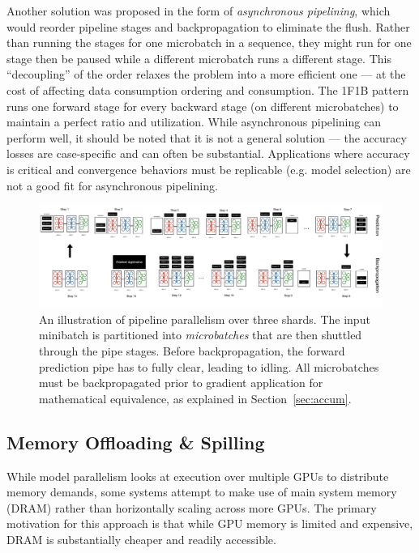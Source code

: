 Another solution was proposed in the form of \textit{asynchronous pipelining}, which would reorder pipeline stages and backpropagation to eliminate the flush. Rather than running the stages for one microbatch in a sequence, they might run for one stage then be paused while a different microbatch runs a different stage. This ``decoupling''  of the order relaxes the problem into a more efficient one --- at the cost of affecting data consumption ordering and consumption. The 1F1B pattern runs one forward stage for every backward stage (on different microbatches) to maintain a perfect ratio and utilization. While asynchronous pipelining can perform well, it should be noted that it is not a general solution --- the accuracy losses are case-specific and can often be substantial. Applications where accuracy is critical and convergence behaviors must be replicable (e.g. model selection) are not a good fit for asynchronous pipelining.

\begin{figure}[th!]
\centering
	\includegraphics[keepaspectratio=true, width=\linewidth]{images/model_parallel_pipeline_parallel}
	\caption{An illustration of pipeline parallelism over three shards. The input minibatch is partitioned into \textit{microbatches} that are then shuttled through the pipe stages. Before backpropagation, the forward prediction pipe has to fully clear, leading to idling. All microbatches must be backpropagated prior to gradient application for mathematical equivalence, as explained in Section~\ref{sec:accum}. }
	\label{fig:pipeline_parallel}
\end{figure}

\subsection{Memory Offloading \& Spilling}\label{sec:spilling}
While model parallelism looks at execution over multiple GPUs to distribute memory demands, some systems attempt to make use of main system memory (DRAM) rather than horizontally scaling across more GPUs. The primary motivation for this approach is that while GPU memory is limited and expensive, DRAM is substantially cheaper and readily accessible.

